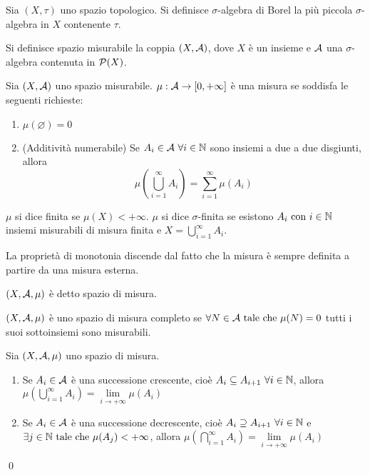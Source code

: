 \begin{definition}
	Sia $(X,\tau)$ uno spazio topologico. Si definisce $\sigma$-algebra di Borel la più piccola $\sigma$-algebra in $X$ contenente $\tau$.
\end{definition}

\begin{definition}
	Si definisce spazio misurabile la coppia $(X,\mathcal{A})$, dove $X$ è un insieme e $\mathcal{A}$ una $\sigma$-algebra contenuta in $\mathcal{P}(X)$.
\end{definition}

\begin{definition}
	[Misura]
	Sia $(X,\mathcal{A})$ uno spazio misurabile. $\mu:\mathcal{A} \to [0,+\infty]$ è una misura se soddisfa le seguenti richieste:
	\begin{enumerate}
		\item $\mu(\varnothing)=0$
		\item (Additività numerabile) Se $A_i \in \mathcal{A} \ \forall i \in \mathbb{N}$ sono insiemi a due a due disgiunti, allora $$\displaystyle\mu\left(\bigcup_{i=1}^\infty A_i \right) = \sum_{i=1}^\infty \mu(A_i)$$
	\end{enumerate}
	$\mu$ si dice finita se $\mu(X)<+\infty$. $\mu$ si dice $\sigma$-finita se esistono $A_i \text{ con } i \in \mathbb{N}$ insiemi misurabili di misura finita e $X=\bigcup\limits_{i=1}^\infty A_i$.
\end{definition}

\begin{remark}
	La proprietà di monotonia discende dal fatto che la misura è sempre definita a partire da una misura esterna.
\end{remark}

\begin{definition}
	$(X,\mathcal{A},\mu)$ è detto spazio di misura.
\end{definition}

\begin{definition}
	$(X,\mathcal{A},\mu)$ è uno spazio di misura completo se $\forall N \in \mathcal{A} \text{ tale che } \mu(N)=0$ tutti i suoi sottoinsiemi sono misurabili.
\end{definition}

\begin{theorem}
	Sia $(X,\mathcal{A},\mu)$ uno spazio di misura.
	\begin{enumerate}
		\item Se $A_i \in \mathcal{A}$ è una successione crescente, cioè $A_i \subseteq A_{i+1} \ \forall i \in \mathbb{N}$, allora $\mu\left(\bigcup\limits_{i=1}^\infty A_i\right) = \lim\limits_{i\to + \infty}\mu(A_i)$
		\item Se $A_i \in \mathcal{A}$ è una successione decrescente, cioè $A_i \supseteq A_{i+1} \ \forall i \in \mathbb{N}$ e $\exists j \in \mathbb{N} \text{ tale che } \mu(A_j) < + \infty$, allora $\mu\left(\bigcap\limits_{i=1}^\infty A_i\right)=\lim\limits_{i\to +\infty}\mu(A_i)$
	\end{enumerate}
	\qed
\end{theorem}

